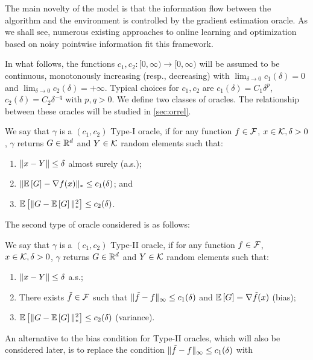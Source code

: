 The main novelty of the model is that the information flow between the algorithm and the environment is controlled by the gradient estimation oracle. As we shall see, numerous existing approaches to online learning and optimization based on noisy pointwise information fit this framework. 

In what follows, the functions $c_1,c_2:[0,\infty)\to [0,\infty)$ will be assumed to be continuous, 
monotonously increasing (resp., decreasing) with 
$\lim_{\delta\to  0} c_1(\delta)=0$ and $\lim_{\delta\to 0} c_2(\delta)=+\infty$.
Typical choices for $c_1,c_2$ are $c_1(\delta) = C_1 \delta^p$, $c_2(\delta) = C_2\delta^{-q}$ with $p,q>0$.
We define two classes of oracles. The relationship between these oracles will be studied in \cref{sec:orrel}.
\begin{definition}
\label{def:oracle1}
We say that $\gamma$ is a  $(c_1,c_2)$ Type-I oracle, if for any function $f\in \mathcal{F}$,
$x\in \mathcal{K},\delta>0$, $\gamma$ returns $G\in \mathbb{R}^d$ and  $Y\in \mathcal{K}$ random elements such that:
\begin{enumerate}
\item $\|x-Y\|\le \delta$ almost surely (a.s.);
\item $\| \mathbb{E}\left[G\right]  - \nabla f(x)  \|_* \le c_1(\delta) $; and
\item $\mathbb{E}\left[\| G -  \mathbb{E}\left[G\right] \|_*^2\right] \le c_2(\delta)$.
\end{enumerate}
\end{definition}
The second type of oracle considered is as follows:
\begin{definition}
\label{def:oracle2}
We say that $\gamma$ is a  $(c_1,c_2)$ Type-II oracle, if for any function $f\in \mathcal{F}$,
$x\in \mathcal{K},\delta>0$, $\gamma$ returns $G\in \mathbb{R}^d$ and  $Y\in \mathcal{K}$ random elements such that:
\begin{enumerate}
\item $\|x-Y\|\le \delta$ a.s.;
\item There exists $\tilde{f} \in \mathcal{F}$ such that  
$\|\tilde{f}- f\|_\infty \le c_1(\delta)$  and
$\mathbb{E}\left[G\right]  = \nabla \tilde{f}(x)$ (bias);
\item $\mathbb{E}\left[\| G -  \mathbb{E}\left[G\right] \|_*^2\right] \le c_2(\delta)$ (variance).
\end{enumerate}
\end{definition}
An alternative to the bias condition for Type-II oracles, which will also be considered later, is to replace the condition $\|\tilde{f}-f\|_\infty \le c_1(\delta)$ with 
